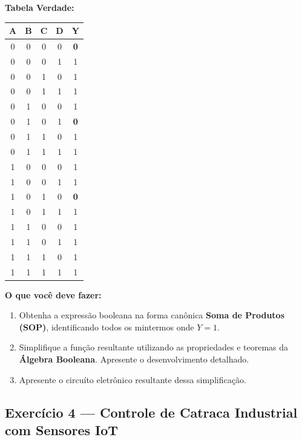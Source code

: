\documentclass[12pt]{article}
\begin{document}
\bigskip

\noindent\textbf{Tabela Verdade:}

\begin{center}
\renewcommand{\arraystretch}{1.2}
\begin{tabular}{|c|c|c|c||c|}
  \hline
  \textbf{A} & \textbf{B} & \textbf{C} & \textbf{D} & \textbf{Y} \\
  \hline
  0 & 0 & 0 & 0 & \textbf{0} \\
  0 & 0 & 0 & 1 & 1 \\
  0 & 0 & 1 & 0 & 1 \\
  0 & 0 & 1 & 1 & 1 \\
  0 & 1 & 0 & 0 & 1 \\
  0 & 1 & 0 & 1 & \textbf{0} \\
  0 & 1 & 1 & 0 & 1 \\
  0 & 1 & 1 & 1 & 1 \\
  1 & 0 & 0 & 0 & 1 \\
  1 & 0 & 0 & 1 & 1 \\
  1 & 0 & 1 & 0 & \textbf{0} \\
  1 & 0 & 1 & 1 & 1 \\
  1 & 1 & 0 & 0 & 1 \\
  1 & 1 & 0 & 1 & 1 \\
  1 & 1 & 1 & 0 & 1 \\
  1 & 1 & 1 & 1 & 1 \\
  \hline
\end{tabular}
\end{center}

\bigskip

\noindent\textbf{O que você deve fazer:}

\begin{enumerate}[label=\textbf{\alph*)}, leftmargin=2cm]
  \item Obtenha a expressão booleana na forma canônica \textbf{Soma de Produtos (SOP)},
        identificando todos os mintermos onde $Y = 1$.
  \item Simplifique a função resultante utilizando as propriedades e teoremas da
        \textbf{Álgebra Booleana}. Apresente o desenvolvimento detalhado.

\item Apresente o circuíto eletrônico resultante dessa simplificação. 
\end{enumerate}



\newpage
\subsection*{Exercício 4 — Controle de Catraca Industrial com Sensores IoT}
\end{document}
